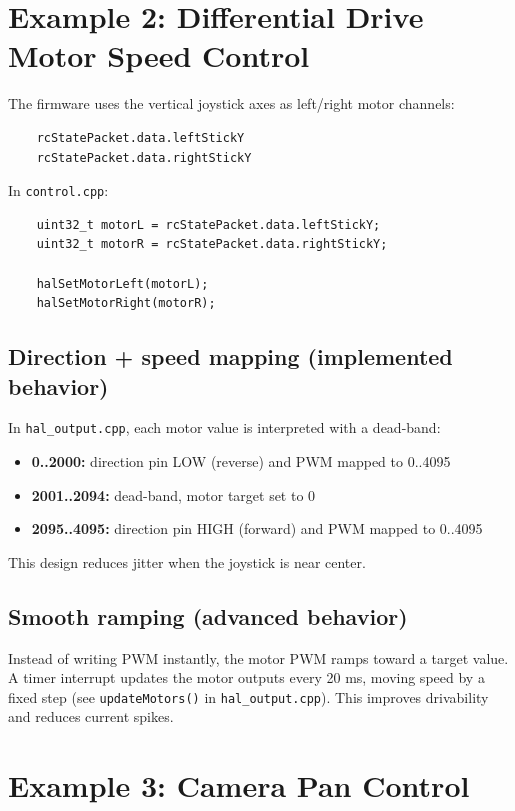 \section{Example 2: Differential Drive Motor Speed Control}
\label{sec:example-motors}

The firmware uses the vertical joystick axes as left/right motor channels:

\begin{verbatim}
    rcStatePacket.data.leftStickY
    rcStatePacket.data.rightStickY
\end{verbatim}

In \texttt{control.cpp}:

\begin{verbatim}
    uint32_t motorL = rcStatePacket.data.leftStickY;
    uint32_t motorR = rcStatePacket.data.rightStickY;

    halSetMotorLeft(motorL);
    halSetMotorRight(motorR);
\end{verbatim}

\subsection{Direction + speed mapping (implemented behavior)}
In \texttt{hal\_output.cpp}, each motor value is interpreted with a dead-band:

\begin{itemize}
    \item \textbf{0..2000:} direction pin LOW (reverse) and PWM mapped to 0..4095
    \item \textbf{2001..2094:} dead-band, motor target set to 0
    \item \textbf{2095..4095:} direction pin HIGH (forward) and PWM mapped to 0..4095
\end{itemize}

This design reduces jitter when the joystick is near center.

\subsection{Smooth ramping (advanced behavior)}
Instead of writing PWM instantly, the motor PWM ramps toward a target value. A timer interrupt updates
the motor outputs every 20 ms, moving speed by a fixed step (see \texttt{updateMotors()} in
\texttt{hal\_output.cpp}). This improves drivability and reduces current spikes.

\section{Example 3: Camera Pan Control}
\label{sec:example-camera}

